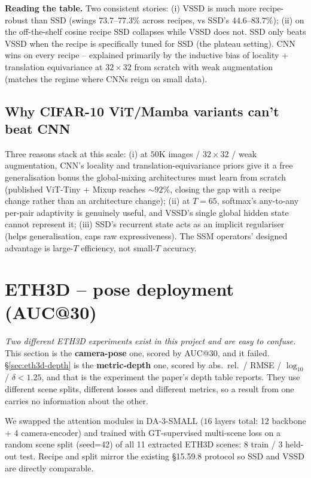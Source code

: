 \documentclass[11pt,a4paper]{article}
\begin{document}
\textbf{Reading the table.} Two consistent stories: (i) VSSD is much
more recipe-robust than SSD (swings $73.7$--$77.3\%$ across recipes,
vs SSD's $44.6$--$83.7\%$); (ii) on the off-the-shelf cosine recipe
SSD collapses while VSSD does not. SSD only beats VSSD when the
recipe is specifically tuned for SSD (the plateau setting). CNN wins
on every recipe -- explained primarily by the inductive bias of
locality + translation equivariance at $32\times 32$ from scratch
with weak augmentation (matches the regime where CNNs reign on small
data).

\subsection{Why CIFAR-10 ViT/Mamba variants can't beat CNN}

Three reasons stack at this scale: (i) at $50$K images / $32\times 32$
/ weak augmentation, CNN's locality and translation-equivariance
priors give it a free generalisation bonus the global-mixing
architectures must learn from scratch (published ViT-Tiny + Mixup
reaches $\sim 92\%$, closing the gap with a recipe change rather than
an architecture change); (ii) at $T=65$, softmax's any-to-any
per-pair adaptivity is genuinely useful, and VSSD's single global
hidden state cannot represent it; (iii) SSD's recurrent state acts as
an implicit regulariser (helps generalisation, caps raw expressiveness).
The SSM operators' designed advantage is large-$T$ efficiency, not
small-$T$ accuracy.

\section{ETH3D -- pose deployment (AUC@30\textdegree)}
\label{sec:eth3d}

\emph{Two different ETH3D experiments exist in this project and are easy to
confuse.} This section is the \textbf{camera-pose} one, scored by
AUC@30\textdegree, and it failed. \S\ref{sec:eth3d-depth} is the
\textbf{metric-depth} one, scored by abs.\ rel.\ / RMSE / $\log_{10}$ /
$\delta{<}1.25$, and that is the experiment the paper's depth table reports.
They use different scene splits, different losses and different metrics, so a
result from one carries no information about the other.

We swapped the attention modules in DA-3-SMALL ($16$ layers total: 12
backbone + 4 camera-encoder) and trained with GT-supervised
multi-scene loss on a random scene split (seed=42) of all 11 extracted
ETH3D scenes: 8 train / 3 held-out test. Recipe and split mirror the
existing \S15.59.8 protocol so SSD and VSSD are directly comparable.
\end{document}

